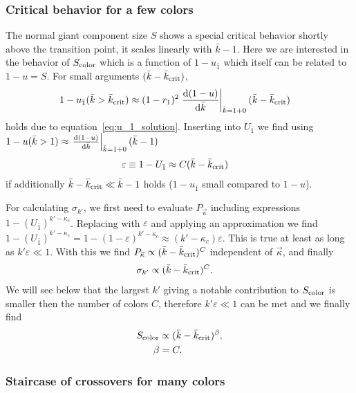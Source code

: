 \documentclass[aps, pre, onecolumn, a4paper, floatfix]{revtex4}
\begin{document}
\subsubsection{Critical behavior for a few colors}

The normal giant component size $S$ shows a special critical behavior shortly above the transition point, 
it scales linearly with $\bar{k}-1$. Here we are interested in the behavior of $S_{\rm color}$ 
which is a function of $1-u_{\bar 1}$ which itself can be related to $1-u=S$. For small arguments
$(\bar{k}-{\bar k}_{\rm crit})$, 
\begin{align}
1-u_{\bar 1}(\bar{k}>{\bar k}_{\rm crit}) &\approx 
(1-r_1)^2 \left.\frac{{\rm d}(1-u)}{{\rm d}{\bar k}}\right|_{\bar{k}=1+0} (\bar{k}-{\bar k}_{\rm crit})
\end{align}
holds due to equation~\ref{eq:u_1_solution}. Inserting into $U_{\bar 1}$ we find using 
$1-u(\bar{k}>1) \approx \left.\frac{{\rm d}(1-u)}{{\rm d}{\bar k}}\right|_{\bar{k}=1+0} (\bar{k}-1)$
\begin{align}
\varepsilon &\equiv 1 - U_{\bar 1} \approx C (\bar{k}-{\bar k}_{\rm crit})
\end{align}
if additionally $\bar{k}-{\bar k}_{\rm crit}\ll\bar{k}-1$ holds ($1-u_{\bar 1}$ small compared to 
$1-u$). 

For calculating $\sigma_{k'}$, we first need to evaluate $P_{\vec \kappa}$ including expressions 
$1-(U_{\bar 1})^{k'-\kappa_c}$. Replacing with $\varepsilon$ and applying an approximation we find 
$1-(U_{\bar 1})^{k'-\kappa_c}=1-(1-\varepsilon)^{k'-\kappa_c}\approx (k'-\kappa_c) \varepsilon$. 
This is true at least as long as $k'\varepsilon\ll 1$. With this we find 
$P_{\vec \kappa}\propto (\bar{k}-{\bar k}_{\rm crit})^C$ independent of $\vec \kappa$, and finally 
\begin{align}
\sigma_{k'} &\propto (\bar{k}-{\bar k}_{\rm crit})^C. 
\end{align}
We will see below that the largest $k'$ giving a notable contribution to $S_{\rm color}$ is 
smaller then the number of colors $C$, therefore $k'\varepsilon\ll 1$ can be met and we finally find 
\begin{align}
S_{\rm color} &\propto (\bar{k}-{\bar k}_{\rm crit})^{\beta},\\
\beta &= C.
\end{align}



\subsubsection{Staircase of crossovers for many colors}
\end{document}
